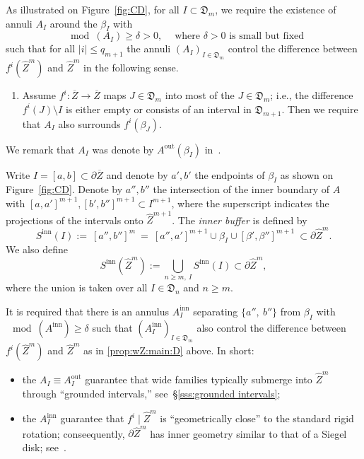 \documentclass[11pt, reqno]{amsart}
\numberwithin{equation}{section}
\theoremstyle{plain}
\theoremstyle{theorem}
\theoremstyle{plain}
\theoremstyle{definition}
\numberwithin{figure}{section}
\renewcommand{\sp}{{\ \ }}
\newcommand{\wZ}{{\widehat Z}}
\begin{document}
As illustrated on Figure~\ref{fig:CD}, for all $I\subset \mathfrak D_m$, we require the existence of annuli $A_I$ around the $\beta_I$ with 
\begin{equation}
\label{eq:dfn:A_I}
\mod(A_I)\ge \delta >0, \sp\sp\text{ where $\delta>0$ is small but fixed} \end{equation}
such that for all $|i|\le q_{m+1}$ the annuli $(A_I)_{I\in \mathfrak D_m}$ control the difference between $f^i(\wZ^m)$ and $\wZ^m$ in the following sense.
\begin{enumerate}[label=(\Alph*), start=4]
\item\label{prop:wZ:main:D}  Assume $f^i\colon \overline Z\to \overline Z$ maps $J\in \mathfrak D_{m}$ into most of the $J\in \mathfrak D_{m}$; i.e., the difference $f^i(J)\setminus I$ is either empty or consists of an interval in $\mathfrak D_{m+1}$. Then we require that $A_I$ also surrounds $f^i(\beta_J)$.
\end{enumerate}
We remark that $A_I$ was denote by $A^\text{out}(\beta_I)$ in~\cite{DL22}.


Write $I=[a,b]\subset \partial \overline Z$ and denote by $a',b'$ the endpoints of $\beta_I$ as shown on Figure~\ref{fig:CD}. Denote by $a'',b''$ the intersection of the inner boundary of $A$ with $[a,a']^{m+1},[b',b'']^{m+1} \subset I^{m+1}$, where the superscript indicates the projections of the intervals onto $\wZ^{m+1}$.  The \emph{inner buffer} is defined by \[ S^\text{inn}(I):=\ [a'',b'']^m\ =\ [a'',a']^{m+1}\cup \beta_I\cup [\beta',\beta'']^{m+1} \ \subset \partial \wZ^m .\] We also define
\[ S^\text{inn} (\wZ^m):= \bigcup_{n\ge m , \ I} S^\text{inn} (I)\subset \partial \wZ^m,\]
where the union is taken over all $I\in \mathfrak D_n$ and $n\ge m$.


It is required that there is an annulus $A^\text{inn} _I$ separating $\{a'', \ b''\}$ from $\beta_I$ with $\mod (A^\text{inn})\ge \delta$ such that $(A^\text{inn}_I)_{I\in \mathfrak D_m}$ also control the difference between $f^i(\wZ^m)$ and $\wZ^m$ as in \ref{prop:wZ:main:D} above. In short: 
\begin{itemize}
    \item the $A_I\equiv A^\text{out}_I$ guarantee that wide families typically submerge into $\wZ^m$ through ``grounded intervals,'' see~\S\ref{sss:grounded intervals};
    \item the $A^\text{inn}_I$ guarantee that $f^i\mid \wZ^m$ is ``geometrically close'' to the standard rigid rotation; conseequently, $\partial \wZ^m$ has inner geometry similar to that of a Siegel disk; see~\cite[Theorem~5.12]{DL22}.
\end{itemize}
\end{document}
